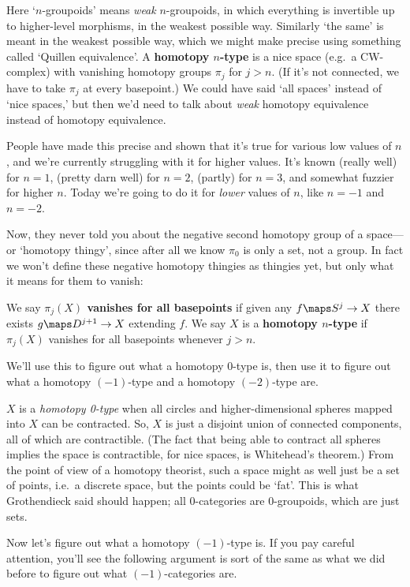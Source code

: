 \documentclass[12pt]{amsart}
\begin{document}
Here `$n$-groupoids' means \emph{weak} $n$-groupoids, in which
everything is invertible up to higher-level morphisms, in the
weakest possible way.  Similarly `the same' is meant in the weakest
possible way, which we might make precise using something
called `Quillen equivalence'.  A {\bf homotopy $n$-type} is
a nice space (e.g.\ a CW-complex) with vanishing homotopy groups
$\pi_j$ for $j>n$.  (If it's not connected, we have to take $\pi_j$ at
every basepoint.)  We could have said `all spaces' instead of `nice
spaces,' but then we'd need to talk about \emph{weak} homotopy
equivalence instead of homotopy equivalence.

People have made this precise and shown that it's true for various low
values of $n$, and we're currently struggling with it for higher
values.  It's known (really well) for $n=1$, (pretty darn well) for
$n=2$, (partly) for $n=3$, and somewhat fuzzier for higher $n$.  Today
we're going to do it for \emph{lower} values of $n$, like $n = -1$
and $n= -2$.  

Now, they never told you about the negative second homotopy group of
a space---or `homotopy thingy', since after all we know $\pi_0$ is 
only a set, not a group.   In fact we won't define these negative 
homotopy thingies as thingies yet, but only what it means for them to vanish:

\begin{defn}
  We say {\bf $\pi_j(X)$ vanishes for all basepoints} if given any
  $f\maps S^j\to X$ there exists $g\maps D^{j+1}\to X$ extending $f$.
  We say $X$ is a {\bf homotopy $n$-type} if $\pi_j(X)$ vanishes
  for all basepoints whenever $j > n$.
\end{defn}

We'll use this to figure out what a homotopy 0-type is, then use it
to figure out what a homotopy $(-1)$-type and a homotopy $(-2)$-type
are.  

$X$ is a \emph{homotopy 0-type} when all circles and higher-dimensional
spheres mapped into $X$ can be contracted.  So, $X$ is just a disjoint
union of connected components, all of which are contractible.  (The
fact that being able to contract all spheres implies the space is
contractible, for nice spaces, is Whitehead's theorem.)  From the
point of view of a homotopy theorist, such a space might as well just
be a set of points, i.e.\ a discrete space, but the points could be
`fat'.  This is what Grothendieck said should happen; all
0-categories are 0-groupoids, which are just sets.

Now let's figure out what a homotopy $(-1)$-type is.
If you pay careful attention, you'll see the following argument 
is sort of the same as what we did
before to figure out what $(-1)$-categories are.
\end{document}
